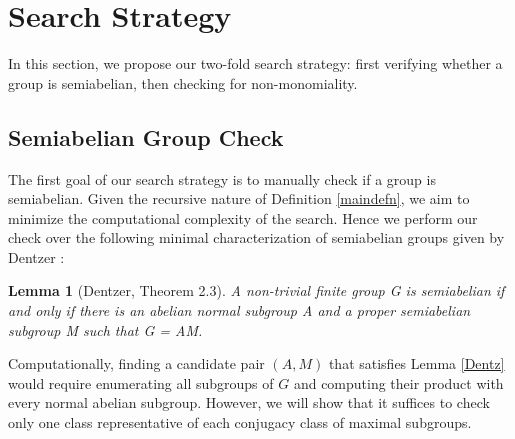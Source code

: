 \documentclass[11pt]{article}
\newtheorem{lem}[thm]{Lemma}
\theoremstyle{definition}
\numberwithin{equation}{section}
\begin{document}
\section{Search Strategy}
\label{sec: semiabelian groups}
\begin{humanblock}
In this section, we propose our two-fold search strategy: first verifying whether a group is semiabelian, then checking for non-monomiality. 

 \subsection{Semiabelian Group Check}{\label{Sec31}}
The first goal of our search strategy is to manually check if a group is semiabelian. Given the recursive nature of Definition \ref{maindefn}, we aim to minimize the computational complexity of the search. Hence we perform our check over the following minimal characterization of semiabelian groups given by Dentzer \cite{Dentzer95}:


\begin{lem}[Dentzer, Theorem 2.3]{\label{Dentz}}
     A non-trivial finite group G is semiabelian if and
only if there is an abelian normal subgroup A and a proper semiabelian subgroup
M such that G = AM.
\end{lem}


Computationally, finding a candidate pair $(A,M)$ that satisfies Lemma \ref{Dentz} would require enumerating all subgroups of $G$ and computing their product with every normal abelian subgroup. However, we will show that it suffices to check only one class representative of each conjugacy class of maximal subgroups. 

\end{humanblock}
\end{document}
